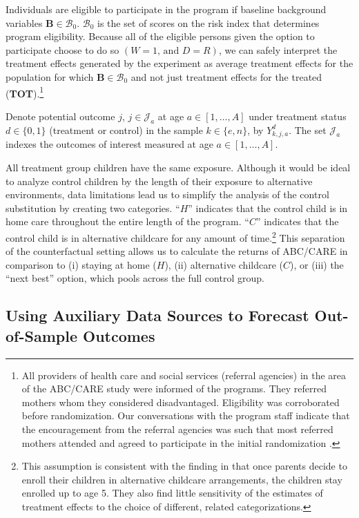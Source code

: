 Individuals are eligible to participate in the program if baseline background variables $\bm{B}\in\mathcal{B}_0$. $\mathcal{B}_0$ is the set of scores on the risk index that determines program eligibility. Because all of the eligible persons given the option to participate choose to do so $(W=1\text{, and } D=R)$, we can safely interpret the treatment effects generated by the experiment as average treatment effects for the population for which $\bm{B}\in\mathcal{B}_0$ and not just treatment effects for the treated (\textbf{TOT}).\footnote{All providers of health care and social services (referral agencies) in the area of the ABC/CARE study were informed of the programs. They referred mothers whom they considered disadvantaged. Eligibility was corroborated before randomization. Our conversations with the program staff indicate that the encouragement from the referral agencies was such that most referred mothers attended and agreed to participate in the initial randomization \citep{Ramey-etal_2012-ABC}.}

Denote potential outcome $j$, $j \in \mathcal{J}_a$ at age $a \in [1, \ldots, A]$ under treatment status $d \in \{0, 1\}$ (treatment or control) in the sample $k \in \{e, n \}$, by $Y_{k,j,a}^d$. The set $\mathcal{J}_a$ indexes the outcomes of interest measured at age $a \in [1, \ldots, A]$.

All treatment group children have the same exposure. Although it would be ideal to analyze control children by the length of their exposure to alternative environments, data limitations lead us to simplify the analysis of the control substitution by creating two categories. ``$H$'' indicates that the control child is in home care throughout the entire length of the program. ``$C$'' indicates that the control child is in alternative childcare for any amount of time.\footnote{This assumption is consistent with the finding in \cite{Garcia_Heckman_Ziff_2017_Gender-Diff_UNPUBLISHED} that once parents decide to enroll their children in alternative childcare arrangements, the children stay enrolled up to age 5. They also find little sensitivity of the estimates of treatment effects to the choice of different, related categorizations.}  This separation of the counterfactual setting allows us to calculate the returns of ABC/CARE in comparison to (i) staying at home ($H$), (ii) alternative childcare ($C$), or (iii) the ``next best'' option, which pools across the full control group.

\subsection{Using Auxiliary Data Sources to Forecast Out-of-Sample Outcomes}\label{sec:usingaux}

